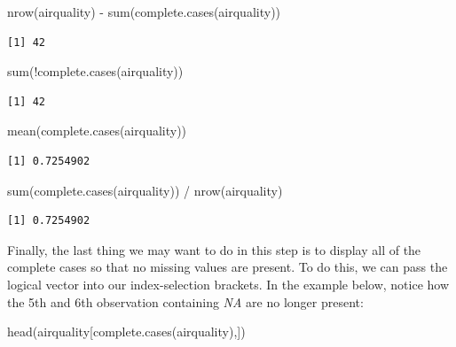 \documentclass[
  letterpaper,
  DIV=11,
  numbers=noendperiod]{scrreprt}
\newenvironment{Shaded}{\begin{snugshade}}{\end{snugshade}}
\newcommand{\FunctionTok}[1]{\textcolor[rgb]{0.28,0.35,0.67}{#1}}
\newcommand{\NormalTok}[1]{\textcolor[rgb]{0.00,0.23,0.31}{#1}}
\newcommand{\SpecialCharTok}[1]{\textcolor[rgb]{0.37,0.37,0.37}{#1}}
\begin{document}
\begin{Shaded}
\begin{Highlighting}[]
\FunctionTok{nrow}\NormalTok{(airquality) }\SpecialCharTok{{-}} \FunctionTok{sum}\NormalTok{(}\FunctionTok{complete.cases}\NormalTok{(airquality))}
\end{Highlighting}
\end{Shaded}

\begin{verbatim}
[1] 42
\end{verbatim}

\begin{Shaded}
\begin{Highlighting}[]
\FunctionTok{sum}\NormalTok{(}\SpecialCharTok{!}\FunctionTok{complete.cases}\NormalTok{(airquality))}
\end{Highlighting}
\end{Shaded}

\begin{verbatim}
[1] 42
\end{verbatim}

\begin{Shaded}
\begin{Highlighting}[]
\FunctionTok{mean}\NormalTok{(}\FunctionTok{complete.cases}\NormalTok{(airquality))}
\end{Highlighting}
\end{Shaded}

\begin{verbatim}
[1] 0.7254902
\end{verbatim}

\begin{Shaded}
\begin{Highlighting}[]
\FunctionTok{sum}\NormalTok{(}\FunctionTok{complete.cases}\NormalTok{(airquality)) }\SpecialCharTok{/} \FunctionTok{nrow}\NormalTok{(airquality)}
\end{Highlighting}
\end{Shaded}

\begin{verbatim}
[1] 0.7254902
\end{verbatim}

Finally, the last thing we may want to do in this step is to display all
of the complete cases so that no missing values are present. To do this,
we can pass the logical vector into our index-selection brackets. In the
example below, notice how the 5th and 6th observation containing
\emph{NA} are no longer present:

\begin{Shaded}
\begin{Highlighting}[]
\FunctionTok{head}\NormalTok{(airquality[}\FunctionTok{complete.cases}\NormalTok{(airquality),])}
\end{Highlighting}
\end{Shaded}
\end{document}
